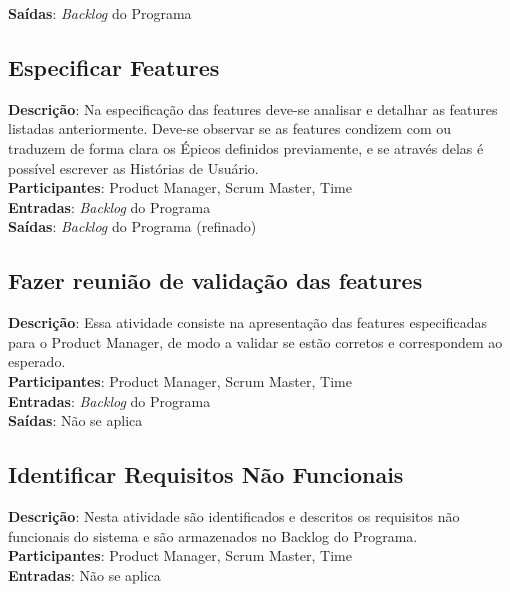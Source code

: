 \textbf{Saídas}:   \textit{Backlog} do Programa \\

\subsection{Especificar Features}
\textbf{Descrição}: Na especificação das features deve-se analisar e detalhar as features listadas anteriormente.
Deve-se observar se as features condizem com ou traduzem de forma clara os Épicos 
definidos previamente, e se através delas é possível escrever as Histórias de Usuário.\\

\textbf{Participantes}: Product Manager, Scrum Master, Time \\

\textbf{Entradas}: \textit{Backlog} do Programa\\

\textbf{Saídas}:   \textit{Backlog} do Programa (refinado)\\

\subsection{Fazer reunião de validação das features}
  \textbf{Descrição}: Essa atividade consiste na apresentação das features especificadas para o Product Manager, de modo a validar se 
  estão corretos e correspondem ao esperado.  \\
  
  \textbf{Participantes}: Product Manager, Scrum Master, Time \\
  
  \textbf{Entradas}: \textit{Backlog} do Programa \\
  
  \textbf{Saídas}:  Não se aplica\\
  
\subsection{Identificar Requisitos Não Funcionais}
  \textbf{Descrição}: Nesta atividade são identificados e descritos os requisitos não funcionais do sistema e são armazenados no Backlog do Programa.  \\
  
  \textbf{Participantes}: Product Manager, Scrum Master, Time \\
  
  \textbf{Entradas}:  Não se aplica\\
  
